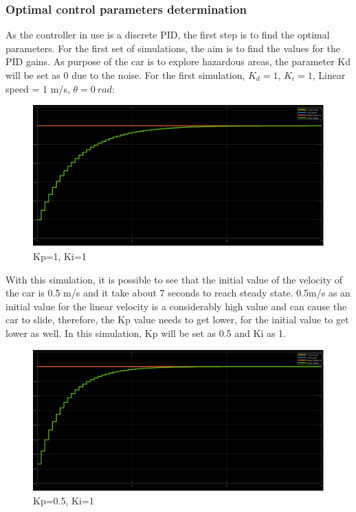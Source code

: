 \subsubsection{Optimal control parameters determination}
As the controller in use is a discrete PID, the first step is to find the optimal parameters.
For the first set of simulations, the aim is to find the values for the PID gains. As purpose of the car is to explore hazardous areas, the parameter Kd will be set as 0 due to the noise. 
For the first simulation, $K_d = 1$, $K_i = 1$, Linear speed = 1 m/s, $\theta =
0~\si{rad}$:
\begin{figure}[!h]
\centering
\includegraphics[width=1.0\textwidth]{./img/pid11.png}
\caption {\label{fig:pid1-p1i1}Kp=1, Ki=1}
\end{figure}
With this simulation, it is possible to see that the initial value of the velocity of the car is 0.5 m/s and it take about 7 seconds to reach steady state. 0.5m/s as an initial value for the linear velocity is a considerably high value and can cause the car to slide, therefore, the Kp value needs to get lower, for the initial value to get lower as well.
In this simulation, Kp will be set as 0.5 and Ki as 1.
\begin{figure}[!h]
\centering
\includegraphics[width=1.0\textwidth]{./img/pid051.png}
\caption {\label{fig:pid1-p05i1}Kp=0.5, Ki=1}
\end{figure}
